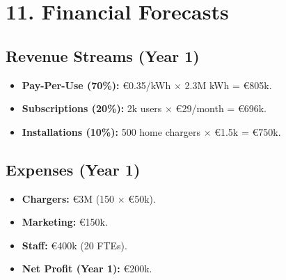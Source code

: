\section{11. Financial Forecasts}

\subsection*{Revenue Streams (Year 1)}
\begin{itemize}
    \item \textbf{Pay-Per-Use (70\%):} €0.35/kWh $\times$ 2.3M kWh = €805k.
    \item \textbf{Subscriptions (20\%):} 2k users $\times$ €29/month = €696k.
    \item \textbf{Installations (10\%):} 500 home chargers $\times$ €1.5k = €750k.
\end{itemize}

\subsection*{Expenses (Year 1)}
\begin{itemize}
    \item \textbf{Chargers:} €3M (150 $\times$ €50k).
    \item \textbf{Marketing:} €150k.
    \item \textbf{Staff:} €400k (20 FTEs).
    
\end{itemize}

\begin{itemize}
    \item \textbf{Net Profit (Year 1):} €200k.
\end{itemize}


